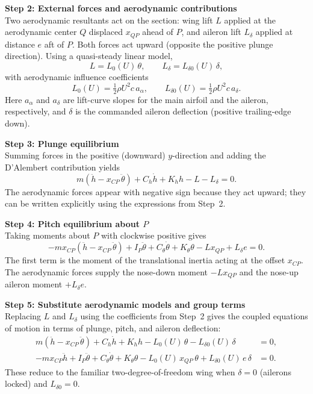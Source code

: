 \documentclass[12pt]{article}
\begin{document}
\begin{stepbox}
\textbf{Step 2: External forces and aerodynamic contributions}\\[0.5em]
Two aerodynamic resultants act on the section: wing lift $L$ applied at the aerodynamic center $Q$ displaced $x_{QP}$ ahead of $P$, and aileron lift $L_\delta$ applied at distance $e$ aft of $P$. Both forces act upward (opposite the positive plunge direction). Using a quasi-steady linear model,
\[
  L = L_0(U)\,\theta, \qquad L_\delta = L_{\delta 0}(U)\,\delta,
\]
with aerodynamic influence coefficients
\[
  L_0(U) = \tfrac{1}{2}\rho U^2 c\, a_\alpha, \qquad
  L_{\delta 0}(U) = \tfrac{1}{2}\rho U^2 c\, a_{\delta}.
\]
Here $a_\alpha$ and $a_\delta$ are lift-curve slopes for the main airfoil and the aileron, respectively, and $\delta$ is the commanded aileron deflection (positive trailing-edge down).
\end{stepbox}

\begin{stepbox}
\textbf{Step 3: Plunge equilibrium}\\[0.5em]
Summing forces in the positive (downward) $y$-direction and adding the D'Alembert contribution yields
\[
  m(\ddot h - x_{CP}\,\ddot\theta) + C_h \dot h + K_h h - L - L_\delta = 0.
\]
The aerodynamic forces appear with negative sign because they act upward; they can be written explicitly using the expressions from Step~2.
\end{stepbox}

\begin{stepbox}
\textbf{Step 4: Pitch equilibrium about $P$}\\[0.5em]
Taking moments about $P$ with clockwise positive gives
\[
  -m x_{CP} (\ddot h - x_{CP}\,\ddot\theta) + I_P \ddot\theta + C_\theta \dot\theta + K_\theta \theta - L x_{QP} + L_\delta e = 0.
\]
The first term is the moment of the translational inertia acting at the offset $x_{CP}$. The aerodynamic forces supply the nose-down moment $-L x_{QP}$ and the nose-up aileron moment $+L_\delta e$.
\end{stepbox}

\begin{stepbox}
\textbf{Step 5: Substitute aerodynamic models and group terms}\\[0.5em]
Replacing $L$ and $L_\delta$ using the coefficients from Step~2 gives the coupled equations of motion in terms of plunge, pitch, and aileron deflection:
\[
\begin{aligned}
  m(\ddot h - x_{CP}\,\ddot\theta) + C_h \dot h + K_h h - L_0(U)\,\theta - L_{\delta 0}(U)\,\delta &= 0, \\
  -m x_{CP} \ddot h + I_P \ddot\theta + C_\theta \dot\theta + K_\theta \theta - L_0(U)\,x_{QP}\,\theta + L_{\delta 0}(U)\,e\,\delta &= 0.
\end{aligned}
\]
These reduce to the familiar two-degree-of-freedom wing when $\delta = 0$ (ailerons locked) and $L_{\delta 0}=0$.
\end{stepbox}
\end{document}
